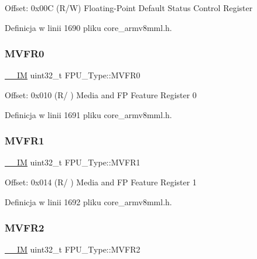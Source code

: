 Offset\+: 0x00C (R/W) Floating-\/\+Point Default Status Control Register 

Definicja w linii 1690 pliku core\+\_\+armv8mml.\+h.

\mbox{\label{struct_f_p_u___type_a4f19014defe6033d070b80af19ef627c}} 
\subsubsection{\texorpdfstring{M\+V\+F\+R0}{MVFR0}}
{\footnotesize\ttfamily \hyperlink{core__sc300_8h_a4cc1649793116d7c2d8afce7a4ffce43}{\+\_\+\+\_\+\+IM} uint32\+\_\+t F\+P\+U\+\_\+\+Type\+::\+M\+V\+F\+R0}

Offset\+: 0x010 (R/ ) Media and FP Feature Register 0 

Definicja w linii 1691 pliku core\+\_\+armv8mml.\+h.

\mbox{\label{struct_f_p_u___type_a66f8cfa49a423b480001a4e101bf842d}} 
\subsubsection{\texorpdfstring{M\+V\+F\+R1}{MVFR1}}
{\footnotesize\ttfamily \hyperlink{core__sc300_8h_a4cc1649793116d7c2d8afce7a4ffce43}{\+\_\+\+\_\+\+IM} uint32\+\_\+t F\+P\+U\+\_\+\+Type\+::\+M\+V\+F\+R1}

Offset\+: 0x014 (R/ ) Media and FP Feature Register 1 

Definicja w linii 1692 pliku core\+\_\+armv8mml.\+h.

\mbox{\label{struct_f_p_u___type_a479130e53a8b3c36fd8ee38b503a3911}} 
\subsubsection{\texorpdfstring{M\+V\+F\+R2}{MVFR2}}
{\footnotesize\ttfamily \hyperlink{core__sc300_8h_a4cc1649793116d7c2d8afce7a4ffce43}{\+\_\+\+\_\+\+IM} uint32\+\_\+t F\+P\+U\+\_\+\+Type\+::\+M\+V\+F\+R2}

